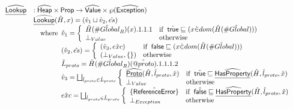 \documentclass{article}
\makeatletter
\newcommand{\SF}[1]{\mbox{\textsf{#1}}}
\newcommand{\wherec}[1]{{\rm where}\begin{array}[t]{l}#1\end{array}}
\newcommand{\ifc}[1]{{\rm if}\begin{array}[t]{l}#1\end{array}}
\newcommand{\owc}{{\rm otherwise}}
\newcommand{\Prop}{\SF{Prop}}
\newcommand{\abs}[1]{\widehat{\SF{#1}}}
\newcommand{\aHeap}{\abs{Heap}}
\newcommand{\aValue}{\abs{Value}}
\newcommand{\powerset}[1]{\wp(#1)}
\newcommand{\ahf}[1]{\widehat{\underline{\sf #1}}}
\newcommand{\varprop}[1]{@#1}
\newcommand{\avarloc}[1]{\hat{\##1}}
\newcommand{\vfalse}{\SF{false}}
\newcommand{\atrue}{\hat{\SF{true}}}
\newcommand{\afalse}{\hat{\SF{false}}}
\makeatother
\begin{document}
\[
\begin{array}{ll}

\ahf{Lookup} & : \aHeap \times \Prop \rightarrow \aValue \times \powerset{\abs{Exception}}\\
&
  \ahf{Lookup}(\hat{H},x)
   = (\hat{v}_1\sqcup\hat{v}_2, \hat{es})\\
& \quad\wherec{
  \hat{v}_1 = \left\{
    \begin{array}{ll}
      \hat{H}(\avarloc{Global}_R)(x).1.1.1
      & \ifc{\atrue\sqsubseteq(x \dot{\in} dom(\hat{H}(\avarloc{Global})))} \\
      \bot_{Value}
      & \owc \\
    \end{array}\right. \\
  (\hat{v}_2, \hat{es}) = \left\{
    \begin{array}{ll}
      (\hat{v}_3, \hat{exc})
      & \ifc{\vfalse\sqsubseteq(x \dot{\in} dom(\hat{H}(\avarloc{Global})))}\\
      (\bot_{Value}, \{\})
      & \owc \\
    \end{array}\right. \\
  \hat{L}_{proto} = \hat{H}(\avarloc{Global}_R)(\hat{\varprop{proto}}).1.1.1.2\\
  \hat{v}_3 = 
    \bigsqcup_{\hat{l}_{proto}\in\hat{L}_{proto}}
    \left\{
    \begin{array}{ll}
      \ahf{Proto}(\hat{H}, \hat{l}_{proto}, \hat{x})
      & \ifc{\atrue\sqsubseteq\ahf{HasProperty}(\hat{H},\hat{l}_{proto},\hat{x})}\\
      \bot_{Value}
      & \owc \\
    \end{array}\right. \\
  \hat{exc} = 
    \bigsqcup_{\hat{l}_{proto}\in\hat{L}_{proto}}
    \left\{
    \begin{array}{ll}
      \{\hat{\SF{ReferenceError}}\}
      & \ifc{\afalse\sqsubseteq\ahf{HasProperty}(\hat{H},\hat{l}_{proto},\hat{x})}\\
      \bot_{Exception}
      & \owc \\
    \end{array}\right. \\
}\\
\\


\end{array}\]
\end{document}

